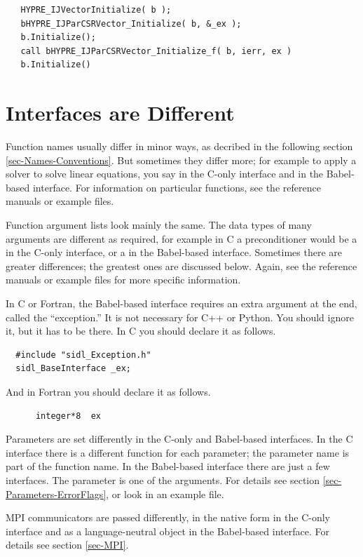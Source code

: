 \begin{verbatim}
   HYPRE_IJVectorInitialize( b );
   bHYPRE_IJParCSRVector_Initialize( b, &_ex );
   b.Initialize();
   call bHYPRE_IJParCSRVector_Initialize_f( b, ierr, ex )
   b.Initialize()
\end{verbatim}


\section{Interfaces are Different}
\label{sec-Interfaces-Different}

Function names usually differ in minor ways, as decribed in the
following section \ref{sec-Names-Conventions}.  But sometimes they
differ more; for example to apply a solver to solve linear equations,
you say  in the C-only interface and  in the
Babel-based interface.  For information on particular functions, see
the reference manuals or example files.

Function argument lists look mainly the same.  The data types of many
arguments are different as required, for example in C a preconditioner
would be a  in the C-only interface, or a
 in the Babel-based interface.  Sometimes there
are greater differences; the greatest ones are discussed below.
Again, see the reference manuals or example files for more specific
information.

In C or Fortran, the Babel-based interface requires an extra argument
at the end, called the ``exception.''  It is not necessary for C++ or
Python.  You should ignore it, but it has to be there.  In C you
should declare it as follows.
\begin{verbatim}
  #include "sidl_Exception.h"
  sidl_BaseInterface _ex;
\end{verbatim}
And in Fortran you should declare it as follows.
\begin{verbatim}
      integer*8  ex
\end{verbatim}

Parameters are set differently in the C-only and Babel-based
interfaces.  In the C interface there is a different 
function for each parameter; the parameter name is part of the
function name.  In the Babel-based interface there are just a few
 interfaces.  The parameter is one of the
arguments.  For details see section
\ref{sec-Parameters-ErrorFlags}, or look in an example file.

MPI communicators are passed differently, in the native form in the
C-only interface and as a language-neutral object in the Babel-based
interface.  For details see section \ref{sec-MPI}.


